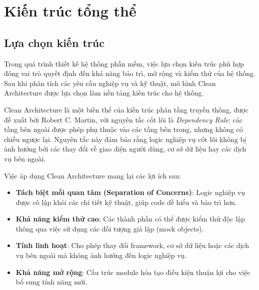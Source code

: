 \section{Kiến trúc tổng thể}
\label{sec:architecture}

\subsection{Lựa chọn kiến trúc}
\label{subsec:architecture-choice}

Trong quá trình thiết kế hệ thống phần mềm, việc lựa chọn kiến trúc phù hợp đóng vai trò quyết định đến khả năng bảo trì, mở rộng và kiểm thử của hệ thống. Sau khi phân tích các yêu cầu nghiệp vụ và kỹ thuật, mô hình Clean Architecture \cite{martin2017clean} được lựa chọn làm nền tảng kiến trúc cho hệ thống.

Clean Architecture là một biến thể của kiến trúc phân tầng truyền thống, được đề xuất bởi Robert C. Martin, với nguyên tắc cốt lõi là \textit{Dependency Rule}: các tầng bên ngoài được phép phụ thuộc vào các tầng bên trong, nhưng không có chiều ngược lại. Nguyên tắc này đảm bảo rằng logic nghiệp vụ cốt lõi không bị ảnh hưởng bởi các thay đổi về giao diện người dùng, cơ sở dữ liệu hay các dịch vụ bên ngoài.

Việc áp dụng Clean Architecture mang lại các lợi ích sau:

\begin{itemize}
    \item \textbf{Tách biệt mối quan tâm (Separation of Concerns)}: Logic nghiệp vụ được cô lập khỏi các chi tiết kỹ thuật, giúp code dễ hiểu và bảo trì hơn.
    \item \textbf{Khả năng kiểm thử cao}: Các thành phần có thể được kiểm thử độc lập thông qua việc sử dụng các đối tượng giả lập (mock objects).
    \item \textbf{Tính linh hoạt}: Cho phép thay đổi framework, cơ sở dữ liệu hoặc các dịch vụ bên ngoài mà không ảnh hưởng đến logic nghiệp vụ.
    \item \textbf{Khả năng mở rộng}: Cấu trúc module hóa tạo điều kiện thuận lợi cho việc bổ sung tính năng mới.
\end{itemize}


